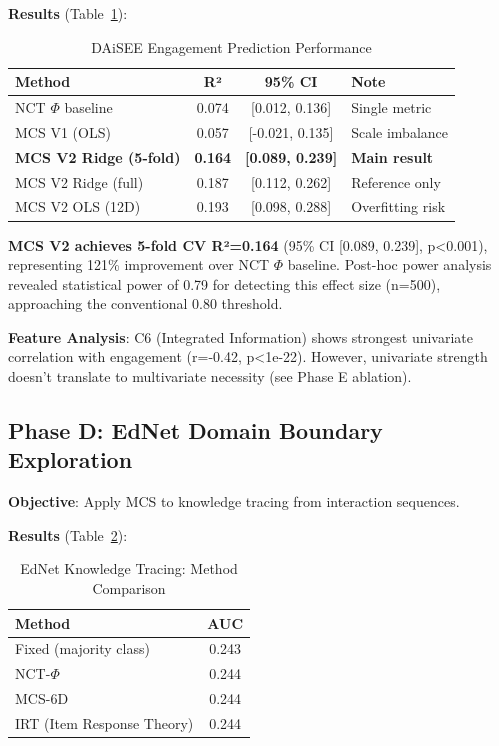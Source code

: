 \documentclass[10pt,journal,compsoc]{IEEEtran}
\begin{document}
\textbf{Results} (Table~\ref{tab:daisee_results}):

\begin{table}[!t]
\renewcommand{\arraystretch}{1.3}
\caption{DAiSEE Engagement Prediction Performance}
\label{tab:daisee_results}
\centering
\begin{tabular}{lccp{1.2in}}
\toprule
\textbf{Method} & \textbf{R²} & \textbf{95\% CI} & \textbf{Note} \\
\midrule
NCT $\Phi$ baseline & 0.074 & [0.012, 0.136] & Single metric \\
MCS V1 (OLS) & 0.057 & [-0.021, 0.135] & Scale imbalance \\
\textbf{MCS V2 Ridge (5-fold)} & \textbf{0.164} & \textbf{[0.089, 0.239]} & \textbf{Main result} \\
MCS V2 Ridge (full) & 0.187 & [0.112, 0.262] & Reference only \\
MCS V2 OLS (12D) & 0.193 & [0.098, 0.288] & Overfitting risk \\
\bottomrule
\end{tabular}
\end{table}

\textbf{MCS V2 achieves 5-fold CV R²=0.164} (95\% CI [0.089, 0.239], p<0.001), representing 121\% improvement over NCT $\Phi$ baseline. Post-hoc power analysis revealed statistical power of 0.79 for detecting this effect size (n=500), approaching the conventional 0.80 threshold.

\textbf{Feature Analysis}: C6 (Integrated Information) shows strongest univariate correlation with engagement (r=-0.42, p<1e-22). However, univariate strength doesn't translate to multivariate necessity (see Phase E ablation).

\subsection{Phase D: EdNet Domain Boundary Exploration}

\textbf{Objective}: Apply MCS to knowledge tracing from interaction sequences.

\textbf{Results} (Table~\ref{tab:ednet_results}):

\begin{table}[!t]
\renewcommand{\arraystretch}{1.2}
\caption{EdNet Knowledge Tracing: Method Comparison}
\label{tab:ednet_results}
\centering
\begin{tabular}{lc}
\toprule
\textbf{Method} & \textbf{AUC} \\
\midrule
Fixed (majority class) & 0.243 \\
NCT-$\Phi$ & 0.244 \\
MCS-6D & 0.244 \\
IRT (Item Response Theory) & 0.244 \\
\bottomrule
\end{tabular}
\end{table}
\end{document}
